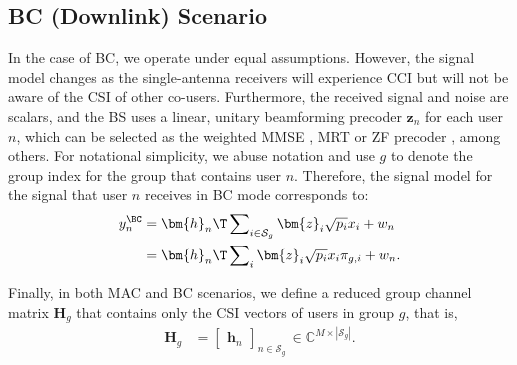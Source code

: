 \subsection{BC (Downlink) Scenario} 

In the case of BC, we operate under equal assumptions. However, the signal model changes as the single-antenna receivers will experience CCI but will not be aware of the CSI of other co-users. Furthermore, the received signal and noise are scalars, and the BS uses a linear, unitary beamforming precoder $\bm{z}_n$ for each user $n$, which can be selected as the weighted MMSE \cite{Bjornson2013wmmsebc}, MRT \cite{Lo1999mrt} or ZF precoder \cite{Jindal206zfbc}, among others. For notational simplicity, we abuse notation and use $g$ to denote the group index for the group that contains user $n$.
Therefore, the signal model for the signal that user $n$ receives in BC mode corresponds to:
\begin{align}\label{eqn:sig_bc}
	{y}_n^{\BC}
	&= \bm{h}_n\T\sum\nolimits_{i \in \mathcal{S}_{g}}\bm{z}_i\sqrt{p_i} x_{i}  + {w}_n\nonumber\\
	&= \bm{h}_n\T\sum\nolimits_{i}\bm{z}_i\sqrt{p_i} x_{i}\pi_{g,i}  + {w}_n.
\end{align}

Finally, in both MAC and BC scenarios, we define a reduced group channel matrix $\bm{H}_g$ that contains only the CSI vectors of users in group $g$, that is,
\begin{align}
	\bm{H}_g&=\begin{bmatrix}\bm{h}_n\end{bmatrix}_{n\in\mathcal{S}_g}\,\in\mathbb{C}^{M\times |\mathcal{S}_g|}.
\end{align}


